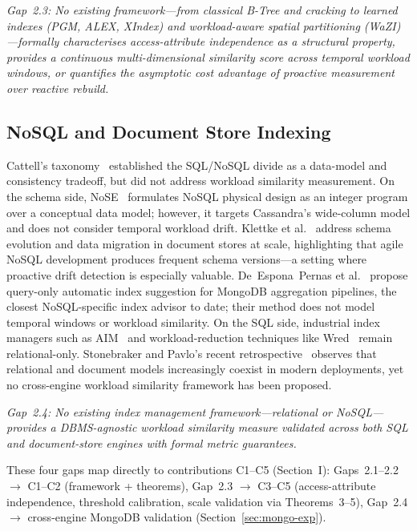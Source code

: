 \documentclass[10pt,twocolumn,a4paper]{article}
\begin{document}
\smallskip\noindent\emph{Gap~2.3: No existing framework---from classical
B-Tree and cracking to learned indexes (PGM, ALEX, XIndex) and
workload-aware spatial partitioning (WaZI)---formally characterises
access-attribute independence as a structural property, provides a
continuous multi-dimensional similarity score across temporal workload
windows, or quantifies the asymptotic cost advantage of proactive
measurement over reactive rebuild.}

\subsection{NoSQL and Document Store Indexing}

Cattell's taxonomy~\cite{Cattell2011NoSQL} established the SQL/NoSQL
divide as a data-model and consistency tradeoff, but did not address
workload similarity measurement. On the schema side,
NoSE~\cite{Mior2017NoSE} formulates NoSQL physical design as an integer
program over a conceptual data model; however, it targets Cassandra's
wide-column model and does not consider temporal workload drift.
Klettke et al.~\cite{Klettke2016SchemaEvol} address schema evolution
and data migration in document stores at scale, highlighting that
agile NoSQL development produces frequent schema versions---a setting
where proactive drift detection is especially valuable.
De~Espona~Pernas et al.~\cite{deEspona2023MongoIndex} propose
query-only automatic index suggestion for MongoDB aggregation
pipelines, the closest NoSQL-specific index advisor to date; their
method does not model temporal windows or workload similarity.
On the SQL side, industrial index managers such as
AIM~\cite{Yadav2023AIM} and workload-reduction techniques like
Wred~\cite{Brucato2024Wred} remain relational-only.
Stonebraker and Pavlo's recent retrospective~\cite{Stonebraker2024WGA}
observes that relational and document models increasingly coexist in
modern deployments, yet no cross-engine workload similarity framework
has been proposed.

\smallskip\noindent\emph{Gap~2.4: No existing index management
framework---relational or NoSQL---provides a DBMS-agnostic workload
similarity measure validated across both SQL and document-store
engines with formal metric guarantees.}

These four gaps map directly to contributions C1--C5
(Section~I): Gaps~2.1--2.2 $\to$ C1--C2 (framework + theorems),
Gap~2.3 $\to$ C3--C5 (access-attribute independence, threshold
calibration, scale validation via Theorems~3--5),
Gap~2.4 $\to$ cross-engine MongoDB validation
(Section~\ref{sec:mongo-exp}).
\end{document}
